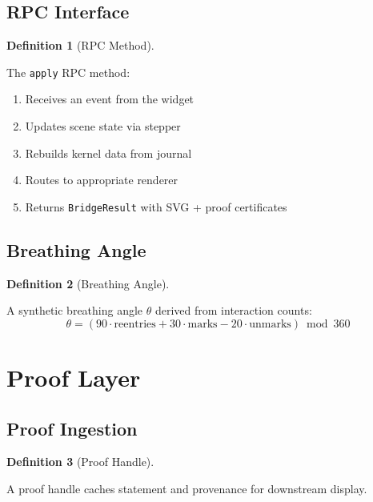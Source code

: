 \documentclass{amsart}
\theoremstyle{definition}
\newtheorem{definition}{Definition}[section]
\theoremstyle{remark}
\begin{document}
\subsection{RPC Interface}
\label{sec:rpc}

\begin{definition}[RPC Method]
\label{def:rpc-apply}

The \texttt{apply} RPC method:
\begin{enumerate}
\item Receives an event from the widget
\item Updates scene state via stepper
\item Rebuilds kernel data from journal
\item Routes to appropriate renderer
\item Returns \texttt{BridgeResult} with SVG + proof certificates
\end{enumerate}
\end{definition}

\subsection{Breathing Angle}
\label{sec:breathing-angle}

\begin{definition}[Breathing Angle]
\label{def:breathing-angle}

A synthetic breathing angle $\theta$ derived from interaction counts:
\[
\theta = (90 \cdot \text{reentries} + 30 \cdot \text{marks} - 20 \cdot \text{unmarks}) \bmod 360
\]
\end{definition}

\section{Proof Layer}

\subsection{Proof Ingestion}
\label{sec:proof-ingestion}

\begin{definition}[Proof Handle]
\label{def:proof-handle}
\uses{}

A proof handle caches statement and provenance for downstream display.
\end{definition}
\end{document}
